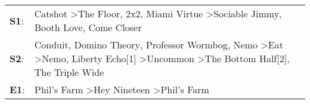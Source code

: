 \begin{supertabular}{p{0.03\textwidth}p{0.92\textwidth}}
 \textbf{S1}:  &                                                                                                                                                       Catshot\textsuperscript{} \textgreater \enspace The Floor\textsuperscript{}, \enspace 2x2\textsuperscript{}, \enspace Miami Virtue\textsuperscript{} \textgreater \enspace Sociable Jimmy\textsuperscript{}, \enspace Booth Love\textsuperscript{}, \enspace Come Closer\textsuperscript{}  \enspace  \\
 \textbf{S2}:  &  Conduit\textsuperscript{}, \enspace Domino Theory\textsuperscript{}, \enspace Professor Wormbog\textsuperscript{}, \enspace Nemo\textsuperscript{} \textgreater \enspace Eat\textsuperscript{} \textgreater \enspace Nemo\textsuperscript{}, \enspace Liberty Echo[1]\textsuperscript{} \textgreater \enspace Uncommon\textsuperscript{} \textgreater \enspace The Bottom Half[2]\textsuperscript{}, \enspace The Triple Wide\textsuperscript{}  \enspace  \\
 \textbf{E1}:  &                                                                                                                                                                                                                                                                                                           Phil's Farm\textsuperscript{} \textgreater \enspace Hey Nineteen\textsuperscript{} \textgreater \enspace Phil's Farm\textsuperscript{}  \enspace  \\
\end{supertabular}
